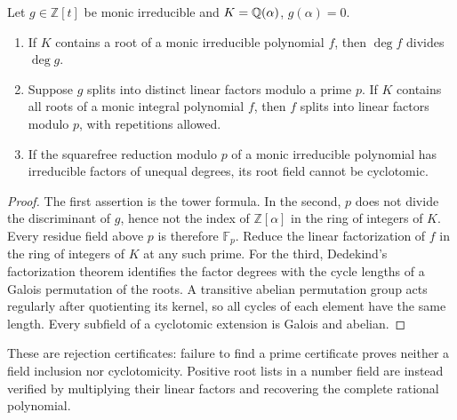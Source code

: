 \begin{lemma}\label{lem:field-prime}
Let $g\in\mathbb Z[t]$ be monic irreducible and
$K=\mathbb Q(\alpha)$, $g(\alpha)=0$.
\begin{enumerate}
\item If $K$ contains a root of a monic irreducible polynomial $f$, then
$\deg f$ divides $\deg g$.
\item Suppose $g$ splits into distinct linear factors modulo a prime $p$.
If $K$ contains all roots of a monic integral polynomial $f$, then $f$
splits into linear factors modulo $p$, with repetitions allowed.
\item If the squarefree reduction modulo $p$ of a monic irreducible
polynomial has irreducible factors of unequal degrees, its root field
cannot be cyclotomic.
\end{enumerate}
\end{lemma}
\begin{proof}
The first assertion is the tower formula. In the second, $p$ does not
divide the discriminant of $g$, hence not the index of
$\mathbb Z[\alpha]$ in the ring of integers of $K$. Every residue field
above $p$ is therefore $\mathbb F_p$. Reduce the linear factorization of
$f$ in the ring of integers of $K$ at any such prime.
For the third, Dedekind's factorization theorem identifies the factor
degrees with the cycle lengths of a Galois permutation of the roots.
A transitive abelian permutation group acts regularly after quotienting
its kernel, so all cycles of each element have the same length.
Every subfield of a cyclotomic extension is Galois and abelian.
\end{proof}
These are rejection certificates: failure to find a prime certificate
proves neither a field inclusion nor cyclotomicity. Positive root lists in
a number field are instead verified by multiplying their linear factors
and recovering the complete rational polynomial.

